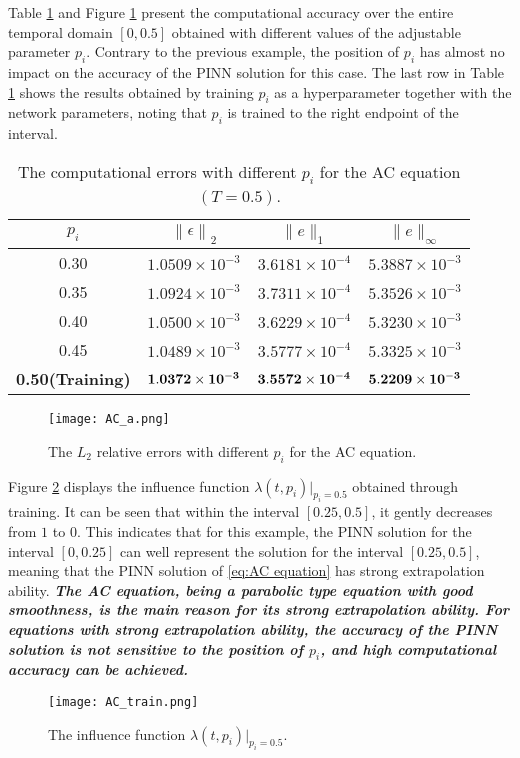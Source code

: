 \documentclass[preprint]{elsarticle}
\numberwithin{table}{section}
\numberwithin{equation}{section}
\numberwithin{figure}{section}
\begin{document}
\begin{CJK}{UTF8}{gbsn}
 Table \ref{Table_AC-PI} and Figure \ref{AC_Ac_PI} present the computational accuracy over the entire temporal domain  $[0,0.5]$ obtained with different values of the adjustable parameter $p_i$.  {Contrary to the previous example, the position of $p_i$
  has almost no impact on the accuracy of the PINN solution for this case. The last row in  Table \ref{Table_AC-PI} shows the results obtained by training $p_i$
  as a hyperparameter together with the network parameters, noting that  
$p_i$
  is trained to the right endpoint of the interval.}
\begin{table}[htbp]
    \centering
    \begin{tabular}{c|ccc}
        \hline
      $p_i$ &  $\left\|\epsilon\right\|_{2}$  & $\|e\|_1 $ & $\|e\|_\infty$ \\ 
        \hline
0.30 & $1.0509 \times 10^{-3}$ & $3.6181 \times 10^{-4}$ & $5.3887 \times 10^{-3}$ \\
0.35 & $1.0924 \times 10^{-3}$ & $3.7311 \times 10^{-4}$ & $5.3526 \times 10^{-3}$ \\
0.40 & $1.0500 \times 10^{-3}$ & $3.6229 \times 10^{-4}$ & $5.3230 \times 10^{-3}$ \\
0.45 & $1.0489 \times 10^{-3}$ & $3.5777 \times 10^{-4}$ & $5.3325 \times 10^{-3}$ \\
\hline
 {\bf 0.50(Training)} &   ${\bf 1.0372 \times 10^{-3}}$ &   ${\bf 3.5572 \times 10^{-4}}$ &  ${\bf 5.2209 \times 10^{-3}}$ \\
        \hline
    \end{tabular}
    \caption{The computational errors with different $p_i$ for the AC equation  $(T=0.5)$.}
    \label{Table_AC-PI}
\end{table}

\begin{figure}[htbp]
\centering
\texttt{[image: AC\_a.png]}
\caption{The $L_2$ relative errors with different $p_i$ for the  AC equation.}
\label{AC_Ac_PI}
\end{figure}

Figure \ref{AC_train} displays  the influence function $\lambda(t,p_i)|_{p_i=0.5}$
  obtained through training. It can be seen that within the interval $[0.25,0.5]$, it gently decreases from $1$ to $0$. This indicates that for this example, the PINN solution for the interval $[0,0.25]$ can well represent the solution for the interval $[0.25,0.5]$, meaning that the PINN solution of \eqref{eq:AC equation} has strong extrapolation ability. \textbf{\textit{The  AC equation, being a parabolic type equation with good smoothness, is the main reason for its strong extrapolation ability. For equations with strong extrapolation ability, the accuracy of the PINN solution is not sensitive to the position of $p_i$, and high computational accuracy can be achieved.}}
\begin{figure}[htbp]
\centering
\texttt{[image: AC\_train.png]}
\caption{The influence function $\lambda(t,p_i)|_{p_i=0.5}$.}
\label{AC_train}
\end{figure}


\end{CJK}
\end{document}
